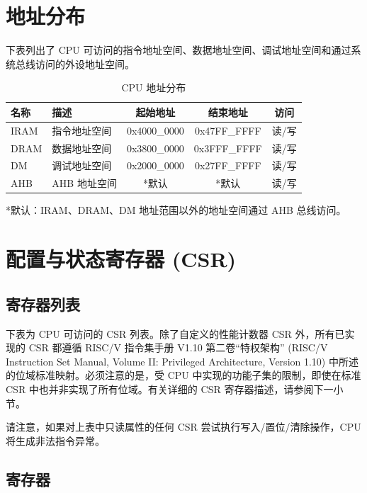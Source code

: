 \documentclass[main\_\_CN.tex]{subfiles}
\begin{document}
\section{地址分布}
下表列出了 CPU 可访问的指令地址空间、数据地址空间、调试地址空间和通过系统总线访问的外设地址空间。

\begin{longtable}{| l| l |c | c | c  |}
\caption{CPU 地址分布} \label{tab:riscvcpu-mem-blocks}
\\ \hline
\rowcolor{lightgray}
名称 & 描述   &  起始地址  &  结束地址  & 访问  \\ \hline
IRAM\label{TBD1} & 指令地址空间  &   0x4000\_0000  &  0x47FF\_FFFF  &  读/写 \\ \hline
DRAM\label{TBD2} & 数据地址空间 &     0x3800\_0000  &  0x3FFF\_FFFF  &  读/写 \\ \hline
DM \label{TBD4} & 调试地址空间  &      0x2000\_0000  &  0x27FF\_FFFF  &  读/写 \\ \hline
AHB\label{TBD3} & AHB 地址空间 &      *默认  &  *默认  &  读/写 \\ \hline
\end{longtable}

*默认：IRAM、DRAM、DM 地址范围以外的地址空间通过 AHB 总线访问。



\section{配置与状态寄存器 (CSR)}
\hypertarget{riscvcpu-cpu-reg-summ}{}
\subsection{寄存器列表}
\label{sec:riscvcpu-cpu-reg-summ}


下表为 CPU 可访问的 CSR 列表。除了自定义的性能计数器 CSR 外，所有已实现的 CSR 都遵循 RISC\-/V 指令集手册 V1.10 第二卷“特权架构” (RISC\-/V Instruction Set Manual, Volume II: Privileged Architecture, Version 1.10) 中所述的位域标准映射。必须注意的是，受 CPU 中实现的功能子集的限制，即使在标准 CSR 中也并非实现了所有位域。有关详细的 CSR 寄存器描述，请参阅下一小节。




请注意，如果对上表中只读属性的任何 CSR 尝试执行写入/置位/清除操作，CPU 将生成非法指令异常。

\subsection{寄存器}
\end{document}
